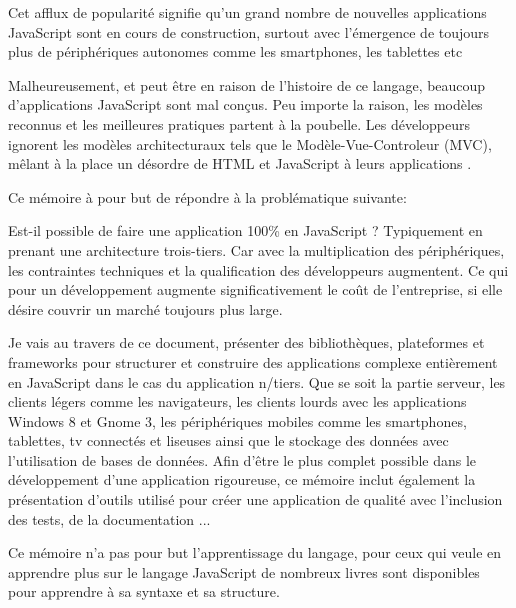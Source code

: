 Cet afflux de popularité signifie qu’un grand nombre de nouvelles applications JavaScript sont en cours de construction, surtout avec l’émergence de toujours plus de périphériques autonomes comme les smartphones, les tablettes etc

Malheureusement, et peut être en raison de l’histoire de ce langage, beaucoup d’applications JavaScript sont mal conçus. Peu importe la raison, les modèles reconnus et les meilleures pratiques partent à la poubelle. Les développeurs ignorent les modèles architecturaux tels que le Modèle-Vue-Controleur (MVC), mêlant à la place un désordre de HTML et JavaScript à leurs applications .

Ce mémoire à pour but de répondre à la problématique suivante:

Est-il possible de faire une application 100\% en JavaScript ? 
Typiquement en prenant une architecture trois-tiers. Car avec la multiplication des périphériques, les contraintes techniques et la qualification des développeurs augmentent. Ce qui pour un développement augmente significativement le coût de l'entreprise, si elle désire couvrir un marché toujours plus large.


Je vais au travers de ce document, présenter des bibliothèques, plateformes et frameworks pour structurer et construire des applications complexe entièrement en JavaScript dans le cas du application n/tiers. Que se soit la partie serveur, les clients légers comme les navigateurs, les clients lourds avec les applications Windows 8 et Gnome 3, les périphériques mobiles comme les smartphones, tablettes, tv connectés et liseuses ainsi que le stockage des données avec l’utilisation de bases de données. Afin d'être le plus complet possible dans le développement d'une application rigoureuse, ce mémoire inclut également la présentation d'outils utilisé pour créer une application de qualité avec l’inclusion des tests, de la documentation ...

Ce mémoire n'a pas pour but l'apprentissage du langage, pour ceux qui veule en apprendre plus sur le langage JavaScript de nombreux livres sont disponibles pour apprendre à sa syntaxe et sa structure.

